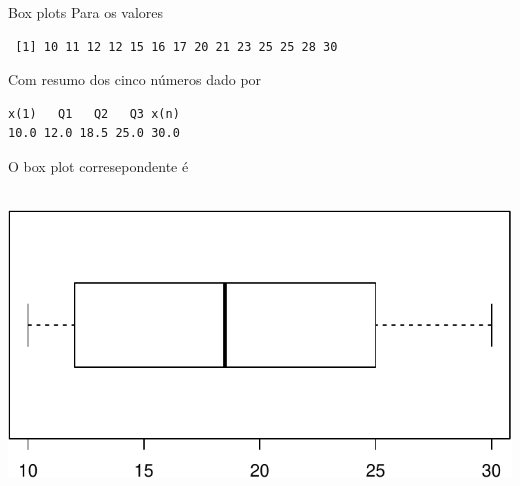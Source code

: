 \documentclass[10pt]{beamer}\usepackage[]{graphicx}\usepackage[]{color}
\makeatletter
\newenvironment{kframe}{%
 \def\at@end@of@kframe{}%
 \ifinner\ifhmode%
  \def\at@end@of@kframe{\end{minipage}}%
  \begin{minipage}{\columnwidth}%
 \fi\fi%
 \def\FrameCommand##1{\hskip\@totalleftmargin \hskip-\fboxsep
 \colorbox{shadecolor}{##1}\hskip-\fboxsep
     \hskip-\linewidth \hskip-\@totalleftmargin \hskip\columnwidth}%
 \MakeFramed {\advance\hsize-\width
   \@totalleftmargin\z@ \linewidth\hsize
   \@setminipage}}%
 {\par\unskip\endMakeFramed%
 \at@end@of@kframe}
\newenvironment{knitrout}{}{} %
\theoremstyle{definition}
\makeatother
\begin{document}
\begin{frame}[fragile]{Box plots}
Para os valores
\begin{knitrout}\footnotesize
{}\color{fgcolor}\begin{kframe}
\begin{verbatim}
 [1] 10 11 12 12 15 16 17 20 21 23 25 25 28 30
\end{verbatim}
\end{kframe}
\end{knitrout}
Com resumo dos cinco números dado por
\begin{knitrout}\footnotesize
{}\color{fgcolor}\begin{kframe}
\begin{verbatim}
x(1)   Q1   Q2   Q3 x(n) 
10.0 12.0 18.5 25.0 30.0 
\end{verbatim}
\end{kframe}
\end{knitrout}
O box plot corresepondente é \\~\\
\begin{knitrout}\footnotesize
{}\color{fgcolor}

{\centering \includegraphics[width=.6\textwidth]{figure/unnamed-chunk-20-1} 

}



\end{knitrout}
\end{frame}
\end{document}
